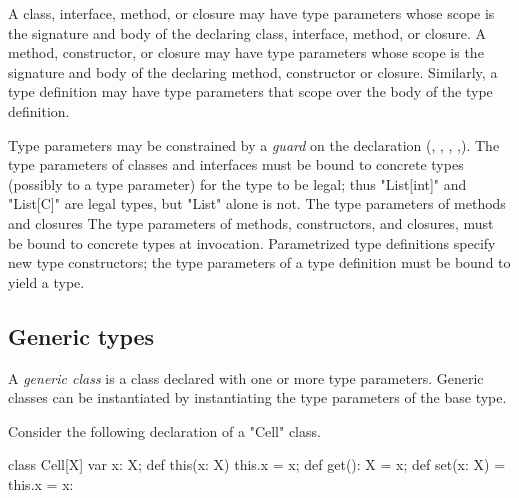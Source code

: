 
\iftypeparams
        A class, interface, method, or closure may have type parameters
        whose scope is the signature and body of the declaring
        class, interface, method,
        or closure.
\else
        A method, constructor, or closure may have type parameters
        whose scope is the signature and body of the declaring method,
        constructor or closure.
\fi
        Similarly, a type definition may have
        type parameters that scope over the body of the type
        definition.

        Type parameters may be constrained by a {\em guard} on the declaration
        (, ,
\iftypeparams\else
        ,
\fi
        ,).
\iftypeparams
        The type parameters of classes and interfaces must be
        bound to concrete types (possibly to a type parameter)
        for the type to be legal; thus \xcd"List[int]" and
        \xcd"List[C]" are legal types, but \xcd"List" alone is
        not.
        The type parameters of
        methods and closures
\else
        The type parameters of
        methods, constructors, and closures,
\fi
        must be bound to
        concrete types at invocation.
        Parametrized type definitions specify new type
        constructors; the type parameters of a type definition must be bound
        to yield a type.

\iftypeparams

\subsection{Generic types}
\label{Generics}
        A {\em generic class} is a class
        declared with one or more type parameters.  Generic
        classes can be instantiated by instantiating the type
        parameters of the base type.

Consider the following declaration of a \xcd"Cell" class.
\begin{xten}
class Cell[X] {
    var x: X;
    def this(x: X) { this.x = x; }
    def get(): X = x;
    def set(x: X) = { this.x = x: }
}
\end{xten}

